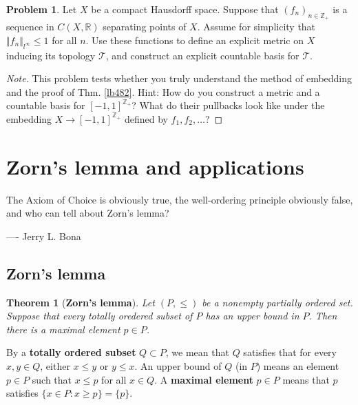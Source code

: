 \documentclass[12pt,b5paper,notitlepage]{article}
\theoremstyle{definition}
\newtheorem{prob}{\color{red}Problem}[section]
\theoremstyle{plain}
\newtheorem{thm}[df]{Theorem}
\newcommand{\mc}{\mathcal}
\newcommand{\Zbb}{\mathbb Z}
\newcommand{\Rbb}{\mathbb R}
\numberwithin{equation}{section}
\begin{document}
\begin{prob}\label{lb533}
Let $X$ be a compact Hausdorff space. Suppose that $(f_n)_{n\in\Zbb_+}$ is a sequence in $C(X,\Rbb)$ separating points of $X$. Assume for simplicity that $\Vert f_n\Vert_{l^\infty}\leq 1$ for all $n$. Use these functions to define an explicit metric on $X$ inducing its topology $\mc T$, and construct an explicit countable basis for $\mc T$. 
\end{prob}



\begin{proof}[Note]
This problem tests whether you truly understand the method of embedding and the proof of Thm. \ref{lb482}. Hint: How do you construct a metric and a countable basis for $[-1,1]^{\Zbb_+}$? What do their pullbacks look like under the embedding $X\rightarrow[-1,1]^{\Zbb_+}$ defined by $f_1,f_2,\dots$?
\end{proof}



\newpage




\section{Zorn's lemma and applications}\label{lb512}


\begin{displayquote}
\small The Axiom of Choice is obviously true, the well-ordering principle obviously false, and who can tell about Zorn's lemma?

\hfill ---- Jerry L. Bona
\end{displayquote}



\subsection{Zorn's lemma}



\begin{thm}[\textbf{Zorn's lemma}]
Let $(P,\leq)$ be a nonempty partially ordered set. Suppose that every totally oredered subset of $P$ has an upper bound in $P$. Then there is a maximal element $p\in P$.
\end{thm}


By a \textbf{totally ordered subset}  $Q\subset P$, we mean that $Q$ satisfies that for every $x,y\in Q$, either $x\leq y$ or $y\leq x$. An upper bound of $Q$ (in $P$) means an element $p\in P$ such that $x\leq p$ for all $x\in Q$. A \textbf{maximal element}  $p\in P$ means that $p$ satisfies $\{x\in P:x\geq p\}=\{p\}$.
\end{document}
